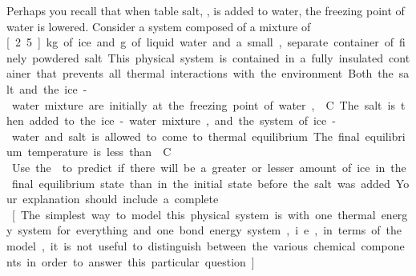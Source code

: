 \label{fnt1.1.4-3}

Perhaps you recall that when table salt, , is added to water, the freezing point of water is lowered. Consider a system composed of a mixture of \unit[2.5]{kg} of ice and \unit[50]{g} of liquid water and a small, separate container of finely powdered salt. This physical system is contained in a fully insulated container that prevents all thermal interactions with the environment. Both the salt and the ice-water mixture are initially at the freezing point of water, \unit[0]{\textdegree C}. The salt is then added to the ice-water mixture, and the system of ice-water and salt is allowed to come to thermal equilibrium. The final equilibrium temperature is less than \unit[0]{\textdegree C}.\\

Use the \EnergyInteractionModel{} to predict if there will be a greater or lesser amount of ice in the final equilibrium state than in the initial state before the salt was added. Your explanation should include a complete \EnergyDiagram{}.\\

[The simplest way to model this physical system is with one thermal energy system for everything and one bond energy system, i.e., in terms of the model, it is not useful to distinguish between the various chemical components in order to answer this particular question.]